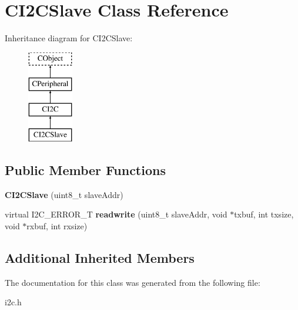 \hypertarget{class_c_i2_c_slave}{\section{C\-I2\-C\-Slave Class Reference}
\label{class_c_i2_c_slave}
}
Inheritance diagram for C\-I2\-C\-Slave\-:\begin{figure}[H]
\begin{center}
\leavevmode
\includegraphics[height=4.000000cm]{class_c_i2_c_slave}
\end{center}
\end{figure}
\subsection*{Public Member Functions}
\begin{DoxyCompactItemize}
\item 
\hypertarget{class_c_i2_c_slave_adfd2a0e20a0560b382f423eb8a350aad}{{\bfseries C\-I2\-C\-Slave} (uint8\-\_\-t slave\-Addr)}\label{class_c_i2_c_slave_adfd2a0e20a0560b382f423eb8a350aad}

\item 
\hypertarget{class_c_i2_c_slave_a1fe39972f6786151907517439c34acc3}{virtual I2\-C\-\_\-\-E\-R\-R\-O\-R\-\_\-\-T {\bfseries readwrite} (uint8\-\_\-t slave\-Addr, void $\ast$txbuf, int txsize, void $\ast$rxbuf, int rxsize)}\label{class_c_i2_c_slave_a1fe39972f6786151907517439c34acc3}

\end{DoxyCompactItemize}
\subsection*{Additional Inherited Members}


The documentation for this class was generated from the following file\-:\begin{DoxyCompactItemize}
\item 
i2c.\-h\end{DoxyCompactItemize}
